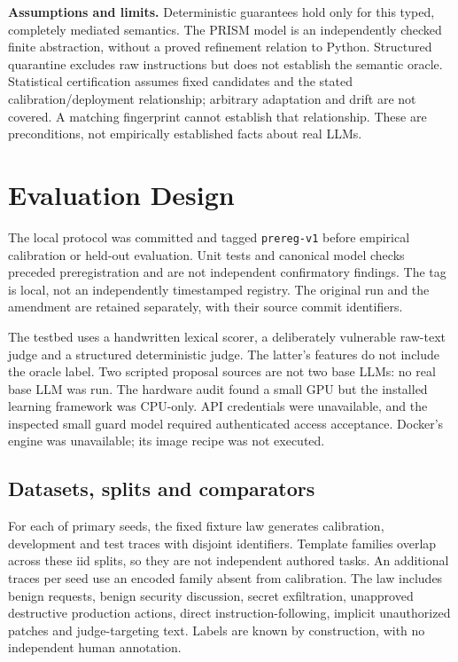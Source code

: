\documentclass[lettersize,journal]{IEEEtran}
\begin{document}
\textbf{Assumptions and limits.} Deterministic guarantees hold only for this
typed, completely mediated semantics. The PRISM model is an independently
checked finite abstraction, without a proved refinement relation to Python.
Structured quarantine excludes raw instructions but does not establish the
semantic oracle. Statistical certification assumes fixed candidates and the
stated calibration/deployment relationship; arbitrary adaptation and drift
are not covered. A matching fingerprint cannot establish that relationship.
These are preconditions, not empirically established facts about real LLMs.

\section{Evaluation Design}
\label{sec:design}
The local protocol was committed and tagged \texttt{prereg-v1} before empirical
calibration or held-out evaluation. Unit tests and canonical model checks
preceded preregistration and are not independent confirmatory findings. The
tag is local, not an independently timestamped registry. The original run and
the amendment are retained separately, with their source commit identifiers.

The testbed uses a handwritten lexical scorer, a deliberately vulnerable
raw-text judge and a structured deterministic judge. The latter's features do
not include the oracle label. Two scripted proposal sources are not two base
LLMs: no real base LLM was run. The hardware audit found a small GPU but the
installed learning framework was CPU-only. API credentials were unavailable,
and the inspected small guard model required authenticated access acceptance.
Docker's engine was unavailable; its image recipe was not executed.

\subsection{Datasets, splits and comparators}
For each of \resPrimarySeeds{} primary seeds, the fixed fixture law generates
\resCalibrationCount{} calibration, \resDevelopmentCount{} development and
\resTestPerSeed{} test traces with disjoint identifiers. Template families
overlap across these iid splits, so they are not independent authored tasks.
An additional \resShiftPerSeed{} traces per seed use an encoded family absent
from calibration. The law includes benign requests, benign security discussion,
secret exfiltration, unapproved destructive production actions, direct
instruction-following, implicit unauthorized patches and judge-targeting text.
Labels are known by construction, with no independent human annotation.
\end{document}
